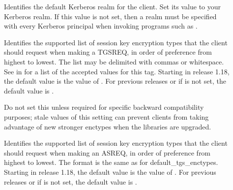 \documentclass[letterpaper,10pt,english]{sphinxmanual}
\begin{document}
\begin{description}
\item[{}] \leavevmode
\sphinxAtStartPar
Identifies the default Kerberos realm for the client.  Set its
value to your Kerberos realm.  If this value is not set, then a
realm must be specified with every Kerberos principal when
invoking programs such as .

\item[{}] \leavevmode
\sphinxAtStartPar
Identifies the supported list of session key encryption types that
the client should request when making a TGS\sphinxhyphen{}REQ, in order of
preference from highest to lowest.  The list may be delimited with
commas or whitespace.  See {\hyperref[\detokenize{admin/conf_files/kdc_conf:encryption-types}]{}} in
{\hyperref[\detokenize{admin/conf_files/kdc_conf:kdc-conf-5}]{}} for a list of the accepted values for this tag.
Starting in release 1.18, the default value is the value of
.  For previous releases or if
 is not set, the default value is
.

\sphinxAtStartPar
Do not set this unless required for specific backward
compatibility purposes; stale values of this setting can prevent
clients from taking advantage of new stronger enctypes when the
libraries are upgraded.

\item[{}] \leavevmode
\sphinxAtStartPar
Identifies the supported list of session key encryption types that
the client should request when making an AS\sphinxhyphen{}REQ, in order of
preference from highest to lowest.  The format is the same as for
default\_tgs\_enctypes.  Starting in release 1.18, the default
value is the value of .  For previous
releases or if  is not set, the default
value is .


\end{description}
\end{document}
